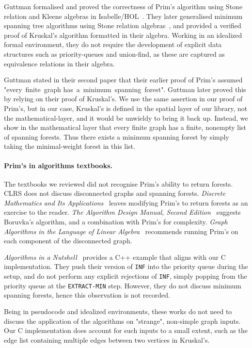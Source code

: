 Guttman formalised and proved the correctness of Prim's algorithm using Stone relation and Kleene algebras in Isabelle/HOL~\cite{DBLP:conf/ictac/Guttmann16}. They later generalised minimum spanning tree algorithms using Stone relation algebras~\cite{DBLP:journals/jlp/Guttmann18}, and provided a verified proof of Kruskal's algorithm formatted in their algebra. Working in an idealized formal environment, they do not require the development of explicit data structures such as priority-queues and union-find, as these are captured as equivalence relations in their algebra.

Guttman stated in their second paper that their earlier proof of Prim's assumed "every~finite~graph has~a~minimum~spanning~forest". Guttman later proved this by relying on their proof of Kruskal's. We use the same assertion in our proof of Prim's, but in our case, Kruskal's is defined in the spatial layer of our library, not the mathematical-layer, and it would be unwieldy to bring it back up. Instead, we show in the mathematical layer that every finite graph has a finite, nonempty list of spanning forests. Thus there exists a minimum spanning forest by simply taking the minimal-weight forest in this list.

\paragraph{Prim's in algorithms textbooks.} The textbooks we reviewed did not recognise Prim's ability to return forests. CLRS does not discuss disconnected graphs and spanning forests. \textit{Discrete Mathematics and Its Applications}~\cite{rozen} leaves modifying Prim's to return forests as an exercise to the reader. \textit{The Algorithm Design Manual, Second Edition}~\cite{DBLP:books/daglib/0022194} suggests Boruvka’s algorithm, and a combination with Prim's for complexity. \textit{Graph Algorithms in the Language of Linear Algebra}~\cite{kepnergilbert} recommends running Prim's on each component of the disconnected graph.

\textit{Algorithms in a Nutshell}~\cite{heineman2008algorithms} provides a C++ example that aligns with our C implementation. They push their version of \texttt{INF} into the priority queue during the setup, and do not perform any explicit rejections of \texttt{INF}, simply popping from the priority queue at the \texttt{EXTRACT-MIN} step. However, they do not discuss minimum spanning forests, hence this observation is not recorded.

Being in pseudocode and idealized environments, these works do not need to discuss the application of the algorithms on "strange", non-simple graph inputs. Our C implementation does account for such inputs to a small extent, such as the edge list containing multiple edges between two vertices in Kruskal's.

